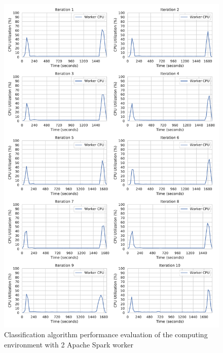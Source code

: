 \begin{figure}[h]
\centering
\includegraphics[scale=0.53]{images/07_evaluation/mortgage/mortgage_2_worker_cpu_performance}
\caption{Classification algorithm performance evaluation of the computing environment with 2 Apache Spark worker}
\label{fig:07_mortgage_static-cpu_results}
\end{figure}

